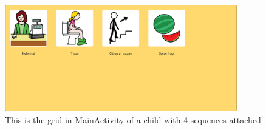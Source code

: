 \begin{figure} [h!]
\centering
\includegraphics[width=0.9\textwidth]{Pics/Sprint2/dialogs/magicGrid.png}
\caption{This is the grid in MainActivity of a child with 4 sequences attached}
\label{fig:GGridView}
\end{figure}

\clearpage